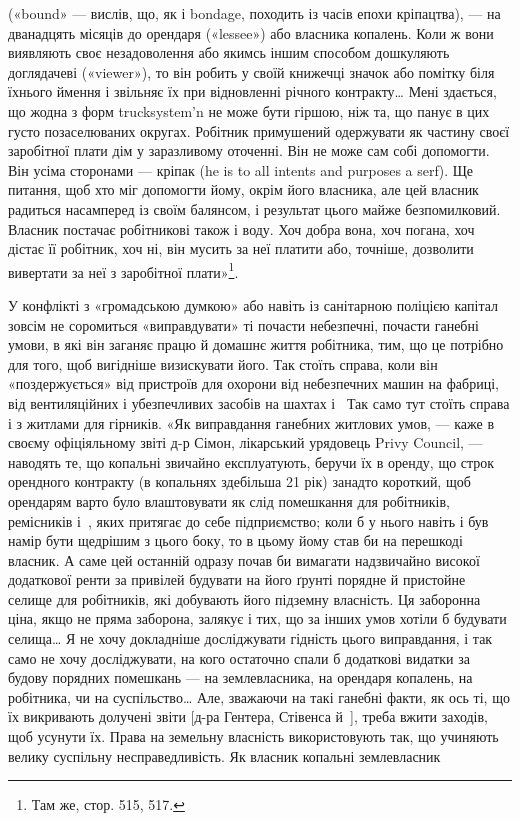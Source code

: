 \parcont{}  %
(«bound» — вислів, що, як і bondage, походить із часів епохи
кріпацтва), — на дванадцять місяців до орендаря («lessee») або
власника копалень. Коли ж вони виявляють своє незадоволення
або якимсь іншим способом дошкуляють доглядачеві («viewer»),
то він робить у своїй книжечці значок або помітку біля їхнього
ймення і звільняє їх при відновленні річного контракту\dots{} Мені
здається, що жодна з форм trucksystem’n не може бути гіршою,
ніж та, що панує в цих густо позаселюваних округах. Робітник
примушений одержувати як частину своєї заробітної плати дім
у заразливому оточенні. Він не може сам собі допомогти. Він
усіма сторонами — кріпак (he is to all intents and purposes a
serf). Ще питання, щоб хто міг допомогти йому, окрім його власника,
але цей власник радиться насамперед із своїм балянсом,
і результат цього майже безпомилковий. Власник постачає робітникові
також і воду. Хоч добра вона, хоч погана, хоч дістає
її робітник, хоч ні, він мусить за неї платити або, точніше, дозволити
вивертати за неї з заробітної плати»\footnote{
Там же, стор. 515, 517.
}.

У конфлікті з «громадською думкою» або навіть із санітарною
поліцією капітал зовсім не соромиться «виправдувати»
ті почасти небезпечні, почасти ганебні умови, в які він заганяє
працю й домашнє життя робітника, тим, що це потрібно для того,
щоб вигідніше визискувати його. Так стоїть справа, коли він
«поздержується» від пристроїв для охорони від небезпечних машин
на фабриці, від вентиляційних і убезпечливих засобів на шахтах
і~ Так само тут стоїть справа і з житлами для гірників. «Як
виправдання ганебних житлових умов, — каже в своєму офіціяльному
звіті д-р Сімон, лікарський урядовець Privy Council, —
наводять те, що копальні звичайно експлуатують, беручи їх в
оренду, що строк орендного контракту (в копальнях здебільша
21 рік) занадто короткий, щоб орендарям варто було влаштовувати
як слід помешкання для робітників, ремісників і~,
яких притягає до себе підприємство; коли б у нього навіть і був
намір бути щедрішим з цього боку, то в цьому йому став би на
перешкоді власник. А саме цей останній одразу почав би вимагати
надзвичайно високої додаткової ренти за привілей будувати
на його ґрунті порядне й пристойне селище для робітників,
які добувають його підземну власність. Ця заборонна ціна, якщо
не пряма заборона, залякує і тих, що за інших умов хотіли б
будувати селища\dots{} Я не хочу докладніше досліджувати гідність
цього виправдання, і так само не хочу досліджувати, на кого
остаточно спали б додаткові видатки за будову порядних помешкань
— на землевласника, на орендаря копалень, на робітника,
чи на суспільство\dots{} Але, зважаючи на такі ганебні факти, як
ось ті, що їх викривають долучені звіти [д-ра Гентера, Стівенса
й~], треба вжити заходів, щоб усунути їх. Права
на земельну власність використовують так, що учиняють велику
суспільну несправедливість. Як власник копальні землевласник
\parbreak{}  %
